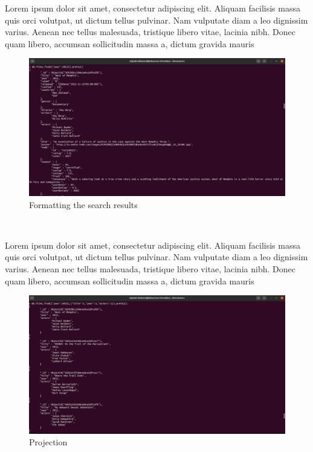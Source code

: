 \begin{spacing}{1.2}
\par Lorem ipsum dolor sit amet, consectetur adipiscing elit. Aliquam facilisis massa quis orci volutpat, ut dictum tellus pulvinar. Nam vulputate diam a leo dignissim varius. Aenean nec tellus malesuada, tristique libero vitae, lacinia nibh. Donec quam libero, accumsan sollicitudin massa a, dictum gravida mauris
\\
\begin{figure}[!htb] 
\begin{center} 
\includegraphics[width=1\linewidth]{Pictures/MongoDB/Examining MongoDB Query Features/Document search/Formatting the search results} 
\end{center} 
\caption{Formatting the search results} 
\end{figure}  \FloatBarrier
\\

\par Lorem ipsum dolor sit amet, consectetur adipiscing elit. Aliquam facilisis massa quis orci volutpat, ut dictum tellus pulvinar. Nam vulputate diam a leo dignissim varius. Aenean nec tellus malesuada, tristique libero vitae, lacinia nibh. Donec quam libero, accumsan sollicitudin massa a, dictum gravida mauris
\\
\begin{figure}[!htb] 
\begin{center} 
\includegraphics[width=1\linewidth]{Pictures/MongoDB/Examining MongoDB Query Features/Document search/Projection} 
\end{center} 
\caption{Projection} 
\end{figure}  \FloatBarrier
\\


\end{spacing}
